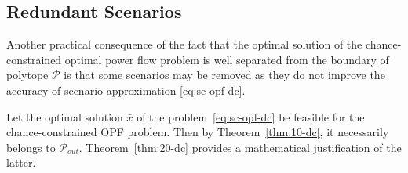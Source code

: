 \subsection{Redundant Scenarios}\label{sec:obs-dc}

Another practical consequence of the fact that the optimal solution of the chance-constrained optimal power flow problem is well separated from the boundary of polytope $\mathcal{P}$ is that some scenarios may be removed as they do not improve the accuracy of scenario approximation \eqref{eq:sc-opf-dc}.

Let the optimal solution $\bar x$ of the problem~\eqref{eq:sc-opf-dc} be feasible for the chance-constrained OPF problem. Then by Theorem~\ref{thm:10-dc}, it necessarily belongs to $\mathcal{P}_{out}$. Theorem~\ref{thm:20-dc} provides a mathematical justification of the latter.


